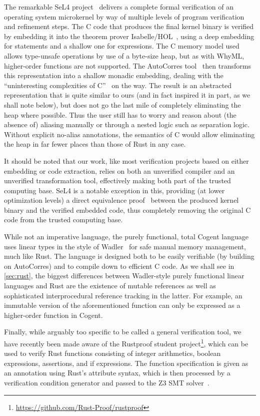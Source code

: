 The remarkable SeL4 project~\cite{klein2009sel4} delivers a complete formal verification of an operating
system microkernel by way of multiple levels of program verification and
refinement steps. The C code that produces the final kernel binary is verified
by embedding it into the theorem prover
Isabelle/HOL~\cite{nipkow2002isabelle}, using a deep embedding for statements
and a shallow one for expressions. The C memory model used allows type-unsafe
operations by use of a byte-size heap, but as with WhyML, higher-order functions are
not supported. The AutoCorres tool~\cite{greenaway2012bridging, greenaway2014don}
then transforms this representation into a shallow monadic embedding,
dealing with the ``uninteresting complexities of C''~\cite{greenaway2014don} on the
way. The result is an abstracted representation that is quite similar to ours
(and in fact inspired it in part, as we shall note below), but does not go the
last mile of completely eliminating the heap where possible. Thus the user still
has to worry and reason about (the absence of) aliasing manually or through a
nested logic such as separation logic. Without explicit
no-alias annotations, the semantics of C would allow eliminating the heap in far fewer places than those
of Rust in any case.

It should be noted that our work, like most verification projects based on
either embedding or code extraction, relies on both
an unverified compiler and an unverified transformation tool, effectively making both
part of the trusted computing base. SeL4 is a notable exception in this,
providing (at lower optimization levels) a direct equivalence proof~\cite{sewell2013translation} between the
produced kernel binary and the verified embedded code, thus completely removing
the original C code from the trusted computing base.

While not an imperative language, the purely functional, total Cogent language~\cite{o2016refinement}
uses linear types in the style of Wadler~\cite{wadler1990linear} for safe
manual memory management, much like Rust. The language is designed both to be
easily verifiable (by building on AutoCorres) and to
compile down to efficient C code. As we shall see in \autoref{sec:rust}, the
biggest differences between Wadler-style purely functional linear languages and Rust are the
existence of mutable references as well as sophisticated interprocedural
reference tracking in the latter. For example, an immutable version of the aforementioned 
function can only be expressed as a higher-order function in Cogent.

Finally, while arguably too specific to be called a general verification tool,
we have recently been made aware of the
Rustproof student project\footnote{\url{https://github.com/Rust-Proof/rustproof}}, which
can be used to verify Rust functions consisting of integer arithmetics, boolean
expressions, assertions, and if expressions. The function specification is given
as an annotation using Rust's attribute syntax, which is then processed by a
verification condition generator and passed to the Z3 SMT solver~\cite{de2008z3}.